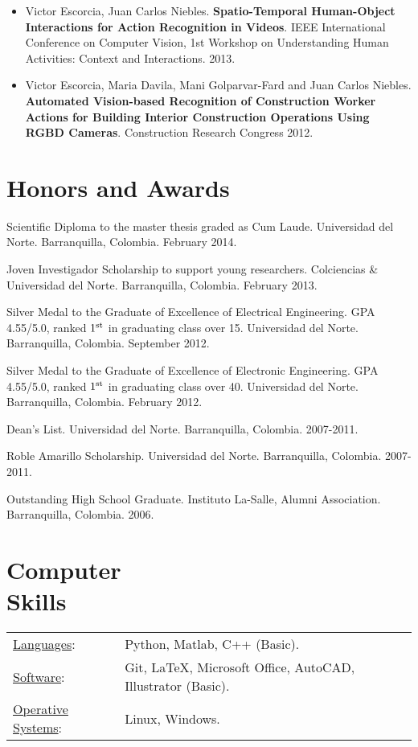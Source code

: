 \documentclass[margin]{res}
\begin{document}
\begin{resume}
\begin{itemize}
\item Victor Escorcia, Juan Carlos Niebles. \textbf{Spatio-Temporal 
Human-Object Interactions for Action Recognition in Videos}. IEEE International
Conference on Computer Vision, 1st Workshop on Understanding Human Activities:
Context and Interactions. 2013.
\smallskip

\item Victor Escorcia, Maria Davila, Mani Golparvar-Fard and Juan Carlos
Niebles. \textbf{Automated Vision-based Recognition of Construction Worker
Actions for Building Interior Construction Operations Using RGBD Cameras}.
Construction Research Congress 2012.

\end{itemize}
               

\section{Honors and Awards}
Scientific Diploma to the master thesis graded as Cum Laude.
Universidad del Norte. Barranquilla, Colombia. February 2014.

Joven Investigador Scholarship to support young researchers.
Colciencias \& Universidad del Norte. Barranquilla, Colombia. February 2013.

Silver Medal to the Graduate of Excellence of Electrical Engineering.
GPA 4.55/5.0, ranked ${1^{{\rm{st}}}}$ in graduating class over 15.
Universidad del Norte. Barranquilla, Colombia. September 2012.

Silver Medal to the Graduate of Excellence of Electronic Engineering.
GPA 4.55/5.0, ranked ${1^{{\rm{st}}}}$ in graduating class over 40.
Universidad del Norte. Barranquilla, Colombia. February 2012.

Dean's List. Universidad del Norte. Barranquilla, Colombia. 2007-2011.

Roble Amarillo Scholarship. Universidad del Norte. 
Barranquilla, Colombia. 2007-2011.

Outstanding High School Graduate. Instituto La-Salle, Alumni Association.
Barranquilla, Colombia. 2006.


\section{Computer \\ Skills}
   \begin{tabular}{l p{3in}}
    \underline{Languages}: & Python, Matlab, C++ (Basic). \\

    \underline{Software}: & Git, LaTeX, Microsoft Office, AutoCAD, Illustrator (Basic). \\
    
    \underline{Operative Systems}: & Linux, Windows. \\
 \end{tabular}

\end{resume} 
\end{document}
